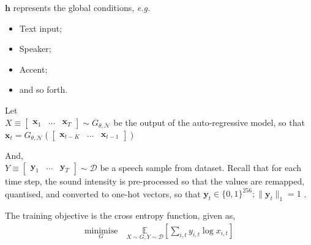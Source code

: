 \documentclass[12pt]{tiet-question-paper}
\begin{document}
{\(\mathbf{h}\) represents the global conditions, \emph{e.g.}
\begin{itemize}
\item Text input;
\item Speaker;
\item Accent;
\item and so forth.
\end{itemize}

\newpage

Let \\[0pt]
\(X\equiv\begin{bmatrix} \mathbf{x}_1 & \ldots &
\mathbf{x}_T \end{bmatrix} \sim G_{\theta,\mathcal{N}}\)
be the output of the auto-regressive model, so that \\[0pt]
\(\mathbf{x}_{t} = G_{\theta,\mathcal{N}}
\left( \begin{bmatrix} \mathbf{x}_{t-K} & \ldots &
\mathbf{x}_{t-1} \end{bmatrix} \right)\)

\bvrskipline[0.25]

And, \\[0pt]
\(Y\equiv\begin{bmatrix} \mathbf{y}_1 & \ldots &
\mathbf{y}_T \end{bmatrix} \sim \mathcal{D}\) be a
speech sample from dataset.  Recall that for each time
step, the sound intensity is pre-processed so that the
values are remapped, quantised, and converted to
one-hot vectors, so that \(\mathbf{y}_t\in\{0,1\}^{256};
\|\mathbf{y}_t\|_{1}=1\) .

\bvrskipline[0.25]

The training objective is the cross entropy function,
given as,
\begin{align*}
  \underset{G}{\text{minimise}}\quad
  \underset{X\sim G, Y\sim\mathcal{D}}{\mathbb{E}}
  \left[ \sum_{i,t} y_{i,t}\log x_{i,t} \right]
\end{align*}


}

\vfill
\bvrhrule
\bvrskipline[-0.85]
\bvrhrule
\end{document}
